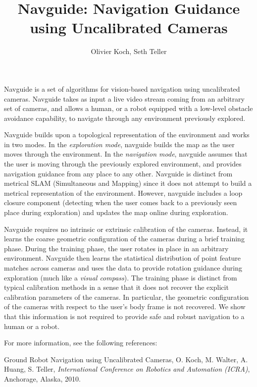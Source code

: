 \documentclass[letter,11pt]{report}
\begin{document}
\title{Navguide: Navigation Guidance using Uncalibrated Cameras}
\author{Olivier Koch, Seth Teller}
\maketitle
Navguide is a set of algorithms for vision-based navigation using uncalibrated cameras. Navguide takes as input a live video stream coming from an arbitrary set of cameras, and allows a human, or a robot equipped with a low-level obstacle avoidance capability, to navigate through any environment previously explored.

Navguide builds upon a topological representation of the environment and works in two modes. In the {\it exploration mode}, navguide builds the map as the user moves through the environment. In the {\it navigation mode}, navguide assumes that the user is moving through the previously explored environment, and provides navigation guidance from any place to any other. Navguide is distinct from metrical SLAM (Simultaneous and Mapping) since it does not attempt to build a metrical representation of the environment. However, navguide includes a loop closure component (detecting when the user comes back to a previously seen place during exploration) and updates the map online during exploration.

Navguide requires no intrinsic or extrinsic calibration of the cameras. Instead, it learns the coarse geometric configuration of the cameras during a brief training phase. During the training phase, the user rotates in place in an arbitrary environment. Navguide then learns the statistical distribution of point feature matches across cameras and uses the data to provide rotation guidance during exploration (much like a {\it visual compass}). The training phase is distinct from typical calibration methods in a sense that it does not recover the explicit calibration parameters of the cameras. In particular, the geometric configuration of the cameras with respect to the user's body frame is not recovered. We show that this information is not required to provide safe and robust navigation to a human or a robot.
\newline

\noindent For more information, see the following references:
\newline

\noindent Ground Robot Navigation using Uncalibrated Cameras, O. Koch, M. Walter, A. Huang, S. Teller, {\it International Conference on Robotics and Automation (ICRA)}, Anchorage, Alaska, 2010.
\newline
\end{document}
